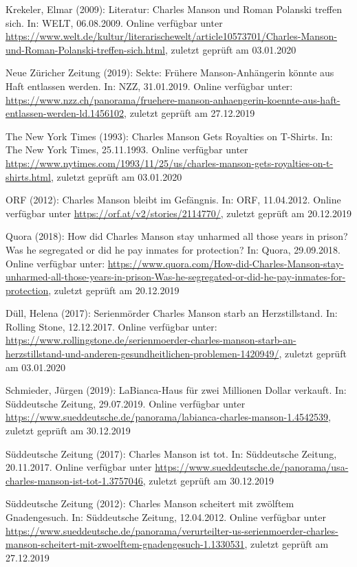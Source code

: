 \documentclass[
]{article}
\begin{document}
Krekeler, Elmar (2009): Literatur: Charles Manson und Roman Polanski
treffen sich. In: WELT, 06.08.2009. Online verfügbar unter
\url{https://www.welt.de/kultur/literarischewelt/article10573701/Charles-Manson-und-Roman-Polanski-treffen-sich.html},
zuletzt geprüft am 03.01.2020

Neue Züricher Zeitung (2019): Sekte: Frühere Manson-Anhängerin könnte
aus Haft entlassen werden. In: NZZ, 31.01.2019. Online verfügbar unter:
\url{https://www.nzz.ch/panorama/fruehere-manson-anhaengerin-koennte-aus-haft-entlassen-werden-ld.1456102},
zuletzt geprüft am 27.12.2019

The New York Times (1993): Charles Manson Gets Royalties on T-Shirts.
In: The New York Times, 25.11.1993. Online verfügbar unter
\url{https://www.nytimes.com/1993/11/25/us/charles-manson-gets-royalties-on-t-shirts.html},
zuletzt geprüft am 03.01.2020

ORF (2012): Charles Manson bleibt im Gefängnis. In: ORF, 11.04.2012.
Online verfügbar unter \url{https://orf.at/v2/stories/2114770/}, zuletzt
geprüft am 20.12.2019

Quora (2018): How did Charles Manson stay unharmed all those years in
prison? Was he segregated or did he pay inmates for protection? In:
Quora, 29.09.2018. Online verfügbar unter:
\url{https://www.quora.com/How-did-Charles-Manson-stay-unharmed-all-those-years-in-prison-Was-he-segregated-or-did-he-pay-inmates-for-protection},
zuletzt geprüft am 20.12.2019

Düll, Helena (2017): Serienmörder Charles Manson starb an
Herzstillstand. In: Rolling Stone, 12.12.2017. Online verfügbar unter:
\url{https://www.rollingstone.de/serienmoerder-charles-manson-starb-an-herzstillstand-und-anderen-gesundheitlichen-problemen-1420949/},
zuletzt geprüft am 03.01.2020

Schmieder, Jürgen (2019): LaBianca-Haus für zwei Millionen Dollar
verkauft. In: Süddeutsche Zeitung, 29.07.2019. Online verfügbar unter
\url{https://www.sueddeutsche.de/panorama/labianca-charles-manson-1.4542539},
zuletzt geprüft am 30.12.2019

Süddeutsche Zeitung (2017): Charles Manson ist tot. In: Süddeutsche
Zeitung, 20.11.2017. Online verfügbar unter
\url{https://www.sueddeutsche.de/panorama/usa-charles-manson-ist-tot-1.3757046},
zuletzt geprüft am 30.12.2019

Süddeutsche Zeitung (2012): Charles Manson scheitert mit zwölftem
Gnadengesuch. In: Süddeutsche Zeitung, 12.04.2012. Online verfügbar
unter
\url{https://www.sueddeutsche.de/panorama/verurteilter-us-serienmoerder-charles-manson-scheitert-mit-zwoelftem-gnadengesuch-1.1330531},
zuletzt geprüft am 27.12.2019
\end{document}
